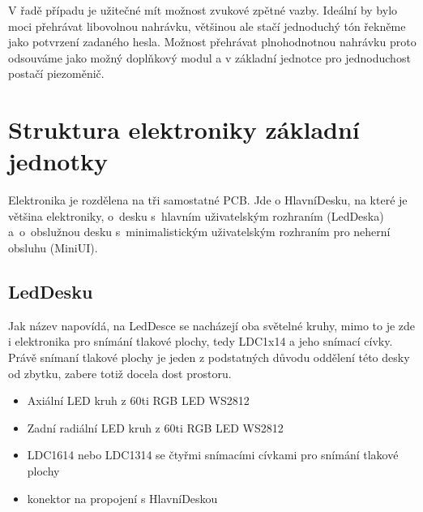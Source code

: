 V řadě případu je užitečné mít možnost zvukové zpětné vazby.
Ideální by bylo moci přehrávat libovolnou nahrávku, většinou ale stačí jednoduchý tón řekněme jako potvrzení zadaného hesla.
Možnost přehrávat plnohodnotnou nahrávku proto odsouváme jako možný doplňkový modul a v základní jednotce pro jednoduchost postačí piezoměnič. 


\section{Struktura elektroniky základní jednotky}

Elektronika je rozdělena na tři samostatné PCB.
Jde o HlavníDesku, na které je většina elektroniky, o~desku s~hlavním uživatelským rozhraním (LedDeska) a~o~obslužnou desku s~minimalistickým uživatelským rozhraním pro neherní obsluhu (MiniUI).

\subsection{LedDesku}
Jak název napovídá, na LedDesce se nacházejí oba světelné kruhy, mimo to je zde i elektronika pro snímání tlakové plochy, tedy LDC1x14 \cite{LDC1614} a jeho snímací cívky.
Právě snímaní tlakové plochy je jeden z podstatných důvodu oddělení této desky od zbytku, zabere totiž docela dost prostoru.

\begin{itemize}
    \item Axiální LED kruh z 60ti RGB LED WS2812
    \item Zadní radiální LED kruh z 60ti RGB LED WS2812
    \item LDC1614 nebo LDC1314 se čtyřmi snímacími cívkami pro snímání tlakové plochy
    \item konektor na propojení s HlavníDeskou
\end{itemize}


